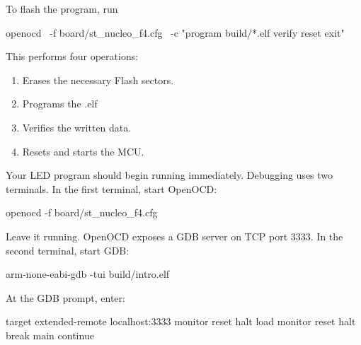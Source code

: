 \documentclass{report}
\begin{document}
    To flash the program, run 
    \bigbreak \noindent 
    \begin{bashcode}
    openocd \
        -f board/st_nucleo_f4.cfg \
        -c "program build/*.elf verify reset exit"
    \end{bashcode}
    \bigbreak \noindent 
    This performs four operations:
    \begin{enumerate}
        \item Erases the necessary Flash sectors.
        \item Programs the .elf
        \item Verifies the written data.
        \item Resets and starts the MCU.
    \end{enumerate}
    Your LED program should begin running immediately.
    \bigbreak \noindent 
    Debugging uses two terminals. In the first terminal, start OpenOCD:
    \bigbreak \noindent 
    \begin{bashcode}
    openocd -f board/st_nucleo_f4.cfg
    \end{bashcode}
    \bigbreak \noindent 
    Leave it running. OpenOCD exposes a GDB server on TCP port 3333. In the second terminal, start GDB:
    \bigbreak \noindent 
    \begin{bashcode}
    arm-none-eabi-gdb -tui build/intro.elf
    \end{bashcode}
    \bigbreak \noindent 
    At the GDB prompt, enter:
    \begin{bashcode}
        target extended-remote localhost:3333
        monitor reset halt
        load
        monitor reset halt
        break main
        continue
    \end{bashcode}
\end{document}
